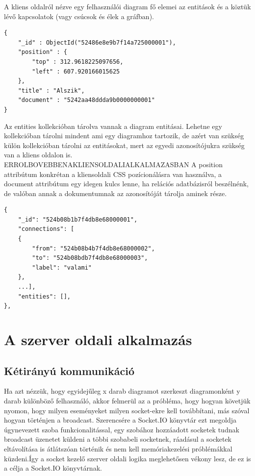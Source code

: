 A kliens oldalról nézve egy felhasználói diagram fő elemei az entitások és a köztük lévő kapcsolatok (vagy csúcsok és élek a gráfban). 


\begin{lstlisting}
{
    "_id" : ObjectId("52486e8e9b7f14a725000001"),
    "position" : {
        "top" : 312.9618225097656,
        "left" : 607.920166015625
    },
    "title" : "Alszik",
    "document" : "5242aa48ddda9b0000000001"
}
\end{lstlisting}

Az entities kollekcióban tárolva vannak a diagram entitásai. Lehetne egy kollekcióban tárolni mindent ami egy diagramhoz tartozik, de azért van szükség külön kollekcióban tárolni az entitásokat, mert az egyedi azonosítójukra szükség van a kliens oldalon is. ERROLBOVEBBENAKLIENSOLDALIALKALMAZASBAN
A position attribútum konkrétan a kliensoldali CSS pozícionálásra van használva, a document attribútum egy idegen kulcs lenne, ha relációs adatbázisról beszélnénk, de valóban annak a dokumentumnak az azonosítóját tárolja aminek része.

\begin{lstlisting}
{
    "_id": "524b08b1b7f4db8e68000001",
    "connections": [
    {
        "from": "524b08b4b7f4db8e68000002",
        "to": "524b08bdb7f4db8e68000003",
        "label": "valami"
    },
    ...],
    "entities": [],
},
\end{lstlisting}


\section{A szerver oldali alkalmazás}






\subsection{Kétirányú kommunikáció}

Ha azt nézzük, hogy egyidejűleg x darab diagramot szerkeszt diagramonként y darab különböző felhasználó, akkor felmerül az a próbléma, hogy hogyan követjük nyomon, hogy milyen eseményeket milyen socket-ekre kell továbbítani, más szóval hogyan történjen a broadcast. Szerencsére a Socket.IO könyvtár ezt megoldja úgynevezett szoba funkcionalitással, egy szobához hozzáadott socketek tudnak broadcast üzenetet küldeni a többi szobabeli socketnek, ráadásul a socketek eltávolítása is átlátszóan történik és nem kell memóriakezelési próblémákkal küzdeni.Így a socket kezelő szerver oldali logika meglehetősen vékony lesz, de ez is a célja a Socket.IO könyvtárnak. 

